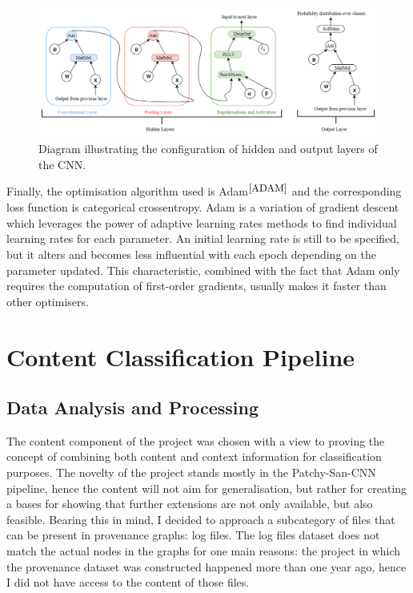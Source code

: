 \begin{figure}[H]
  \centering
  \centerline{\includegraphics[scale=0.5]{Images/cnn_layers.png}}
  \caption{Diagram illustrating the configuration of hidden and output layers of the CNN.}
  \label{cnn_layers}
\end{figure}

Finally, the optimisation algorithm used is Adam$^{\small \cite{ADAM}}$ and the corresponding loss function is categorical crossentropy. Adam is a variation of gradient descent which leverages the power of adaptive learning rates methods to find individual learning rates for each parameter. An initial learning rate is still to be specified, but it alters and becomes less influential with each epoch depending on the parameter updated. This characteristic, combined with the fact that Adam only requires the computation of first-order gradients, usually makes it faster than other optimisers.  


\section{Content Classification Pipeline}
\subsection{Data Analysis and Processing}

The content component of the project was chosen with a view to proving the concept of combining both content and context information for classification purposes. The novelty of the project stands mostly in the Patchy-San-CNN pipeline, hence the content will not aim for generalisation, but rather for creating a bases for showing that further extensions are not only available, but also feasible. Bearing this in mind, I decided to approach a subcategory of files that can be present in provenance graphs: log files. The log files dataset does not match the actual nodes in the graphs for one main reasons: the project in which the provenance dataset was constructed happened more than one year ago, hence I did not have access to the content of those files. \\

